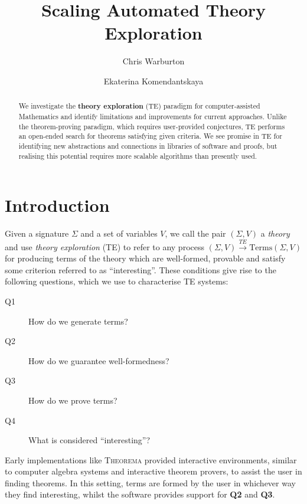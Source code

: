 \documentclass{llncs}
\begin{document}
%
\pagestyle{headings}  %

\mainmatter              %
%
\title{Scaling Automated Theory Exploration}
%
\author{Chris Warburton \and Ekaterina Komendantskaya}
%

\maketitle              %

\begin{abstract}
We investigate the \textbf{theory exploration} (TE)
paradigm for computer-assisted Mathematics and identify limitations and
improvements for current approaches. Unlike the theorem-proving paradigm,
which requires user-provided conjectures, TE performs an open-ended
search for theorems satisfying given criteria. We see promise in TE for
identifying new abstractions and connections in libraries of software
and proofs, but realising this potential requires more scalable
algorithms than presently used.
\end{abstract}
%
\section{Introduction}

Given a signature $\Sigma$ and a set of variables $V$, we call the pair
$(\Sigma, V)$ a \emph{theory} and use \emph{theory exploration} (TE) to refer
to any process $(\Sigma, V) \overset{TE}{\rightarrow} \text{Terms}(\Sigma, V)$
for producing terms of the theory which are well-formed, provable and satisfy
some criterion referred to as ``interesting''. These conditions give rise to the
following questions, which we use to characterise TE systems:
\begin{description}
\item [Q1] \label{Q1} How do we generate terms?
\item [Q2] \label{Q2} How do we guarantee well-formedness?
\item [Q3] \label{Q3} How do we prove terms?
\item [Q4] \label{Q4} What is considered ``interesting''?
\end{description}

Early implementations like \textsc{Theorema} \cite{buchberger2000theory}
provided interactive environments, similar to computer algebra systems and
interactive theorem provers, to assist the user in finding theorems. In this
setting, terms are formed by the user in whichever way they find interesting,
whilst the software provides support for \textbf{Q2} and \textbf{Q3}.
\end{document}

